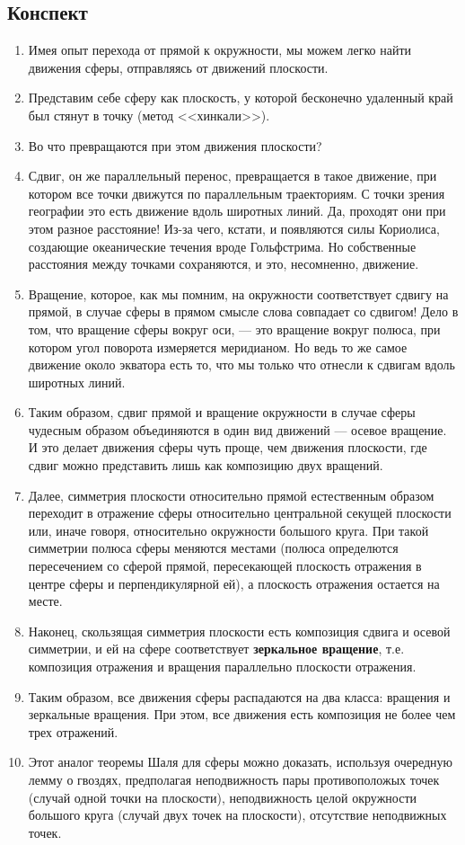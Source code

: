 \subsection*{Конспект}
\begin{enumerate}
\item Имея опыт перехода от прямой к окружности, мы можем легко найти движения сферы, отправляясь от движений плоскости.
\item Представим себе сферу как плоскость, у которой бесконечно удаленный край был стянут в точку (метод <<хинкали>>).
\item Во что превращаются при этом движения плоскости?
\item Сдвиг, он же параллельный перенос, превращается в такое движение, при котором все точки движутся по параллельным траекториям. С точки зрения географии это есть движение вдоль широтных линий. Да, проходят они при этом разное расстояние! Из-за чего, кстати, и появляются силы Кориолиса, создающие океанические течения вроде Гольфстрима. Но собственные расстояния между точками сохраняются, и это, несомненно, движение.
\item Вращение, которое, как мы помним, на окружности соответствует сдвигу на прямой, в случае сферы в прямом смысле слова совпадает со сдвигом! Дело в том, что вращение сферы вокруг оси, --- это вращение вокруг полюса, при котором угол поворота измеряется меридианом. Но ведь то же самое движение около экватора есть то, что мы только что отнесли к сдвигам вдоль широтных линий.
\item Таким образом, сдвиг прямой и вращение окружности в случае сферы чудесным образом объединяются в один вид движений --- осевое вращение. И это делает движения сферы чуть проще, чем движения плоскости, где сдвиг можно представить лишь как композицию двух вращений.
\item Далее, симметрия плоскости относительно прямой естественным образом переходит в отражение сферы относительно центральной секущей плоскости или, иначе говоря, относительно окружности большого круга. При такой симметрии полюса сферы меняются местами (полюса определются пересечением со сферой прямой, пересекающей плоскость отражения в центре сферы и перпендикулярной ей), а плоскость отражения остается на месте.
\item Наконец, скользящая симметрия плоскости есть композиция сдвига и осевой симметрии, и ей на сфере соответствует \textbf{зеркальное вращение}, т.е. композиция отражения и вращения параллельно плоскости отражения.
\item Таким образом, все движения сферы распадаются на два класса: вращения и зеркальные вращения. При этом, все движения есть композиция не более чем трех отражений.
\item Этот аналог теоремы Шаля для сферы можно доказать, используя очередную лемму о гвоздях, предполагая неподвижность пары противоположых точек (случай одной точки на плоскости), неподвижность целой окружности большого круга (случай двух точек на плоскости), отсутствие неподвижных точек.
\end{enumerate}

